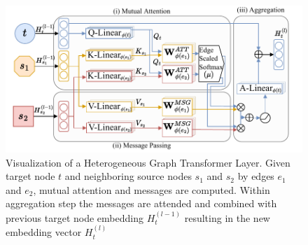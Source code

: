\begin{figure}[!ht]
\centering
\includegraphics[width=0.8\columnwidth]{resources/hgt.pdf}
\caption{
    Visualization of a Heterogeneous Graph Transformer Layer. Given target node $t$ and neighboring source nodes $s_1$ and $s_2$ by edges $e_1$ and $e_2$, mutual attention and messages are computed. Within aggregation step the messages are attended and combined with previous target node embedding $H^{(l-1)}_t$ resulting in the new embedding vector $H^{(l)}_t$
}
\label{fig:hgt}
\end{figure}    